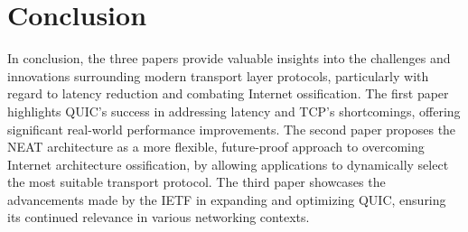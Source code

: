 \section{Conclusion}%
\label{sec:Conclusion}
In conclusion, the three papers provide valuable insights into the challenges and innovations surrounding modern transport layer protocols, particularly with regard to latency reduction and combating Internet ossification. 
The first paper highlights QUIC's success in addressing latency and TCP's shortcomings, offering significant real-world performance improvements. The second paper proposes the NEAT architecture as a more flexible, future-proof approach to overcoming Internet architecture ossification, by allowing applications to dynamically select the most suitable transport protocol.
The third paper showcases the advancements made by the IETF in expanding and optimizing QUIC, ensuring its continued relevance in various networking contexts.

